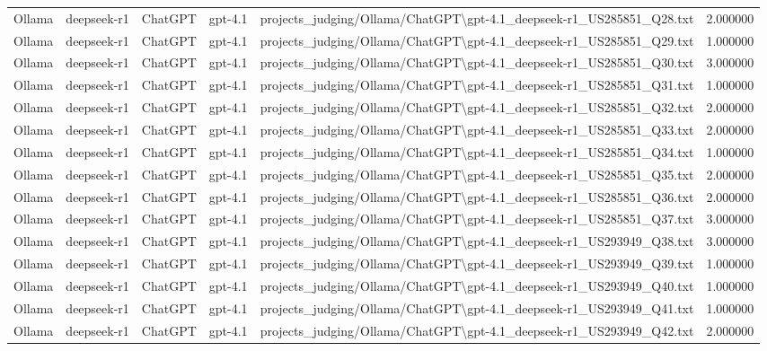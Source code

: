 \begin{table}[H]
\begin{tabular}{lllllr}
Ollama & deepseek-r1 & ChatGPT & gpt-4.1 & projects\_judging/Ollama/ChatGPT\textbackslash gpt-4.1\_deepseek-r1\_US285851\_Q28.txt & 2.000000 \\
Ollama & deepseek-r1 & ChatGPT & gpt-4.1 & projects\_judging/Ollama/ChatGPT\textbackslash gpt-4.1\_deepseek-r1\_US285851\_Q29.txt & 1.000000 \\
Ollama & deepseek-r1 & ChatGPT & gpt-4.1 & projects\_judging/Ollama/ChatGPT\textbackslash gpt-4.1\_deepseek-r1\_US285851\_Q30.txt & 3.000000 \\
Ollama & deepseek-r1 & ChatGPT & gpt-4.1 & projects\_judging/Ollama/ChatGPT\textbackslash gpt-4.1\_deepseek-r1\_US285851\_Q31.txt & 1.000000 \\
Ollama & deepseek-r1 & ChatGPT & gpt-4.1 & projects\_judging/Ollama/ChatGPT\textbackslash gpt-4.1\_deepseek-r1\_US285851\_Q32.txt & 2.000000 \\
Ollama & deepseek-r1 & ChatGPT & gpt-4.1 & projects\_judging/Ollama/ChatGPT\textbackslash gpt-4.1\_deepseek-r1\_US285851\_Q33.txt & 2.000000 \\
Ollama & deepseek-r1 & ChatGPT & gpt-4.1 & projects\_judging/Ollama/ChatGPT\textbackslash gpt-4.1\_deepseek-r1\_US285851\_Q34.txt & 1.000000 \\
Ollama & deepseek-r1 & ChatGPT & gpt-4.1 & projects\_judging/Ollama/ChatGPT\textbackslash gpt-4.1\_deepseek-r1\_US285851\_Q35.txt & 2.000000 \\
Ollama & deepseek-r1 & ChatGPT & gpt-4.1 & projects\_judging/Ollama/ChatGPT\textbackslash gpt-4.1\_deepseek-r1\_US285851\_Q36.txt & 2.000000 \\
Ollama & deepseek-r1 & ChatGPT & gpt-4.1 & projects\_judging/Ollama/ChatGPT\textbackslash gpt-4.1\_deepseek-r1\_US285851\_Q37.txt & 3.000000 \\
Ollama & deepseek-r1 & ChatGPT & gpt-4.1 & projects\_judging/Ollama/ChatGPT\textbackslash gpt-4.1\_deepseek-r1\_US293949\_Q38.txt & 3.000000 \\
Ollama & deepseek-r1 & ChatGPT & gpt-4.1 & projects\_judging/Ollama/ChatGPT\textbackslash gpt-4.1\_deepseek-r1\_US293949\_Q39.txt & 1.000000 \\
Ollama & deepseek-r1 & ChatGPT & gpt-4.1 & projects\_judging/Ollama/ChatGPT\textbackslash gpt-4.1\_deepseek-r1\_US293949\_Q40.txt & 1.000000 \\
Ollama & deepseek-r1 & ChatGPT & gpt-4.1 & projects\_judging/Ollama/ChatGPT\textbackslash gpt-4.1\_deepseek-r1\_US293949\_Q41.txt & 1.000000 \\
Ollama & deepseek-r1 & ChatGPT & gpt-4.1 & projects\_judging/Ollama/ChatGPT\textbackslash gpt-4.1\_deepseek-r1\_US293949\_Q42.txt & 2.000000 \\

\end{tabular}
\end{table}
